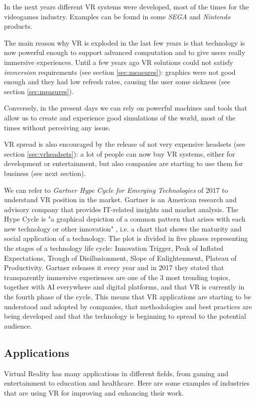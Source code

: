 \documentclass[binding=0.6cm,LaM]{sapthesis}
\begin{document}
In the next years different VR systems were developed, most of the times for the videogames industry. Examples can be found in some \textit{SEGA} and \textit{Nintendo} products. 

The main reason why VR is exploded in the last few years is that technology is now powerful enough to support advanced computation and to give users really immersive experiences. Until a few years ago VR solutions could not satisfy \textit{immersion} requirements (see section \ref{sec:measures}): graphics were not good enough and they had low refresh rates, causing the user some sickness (see section \ref{sec:measures}).

Conversely, in the present days we can rely on powerful machines and tools that allow us to create and experience good simulations of the world, most of the times without perceiving any issue.

VR spread is also encouraged by the release of not very expensive headsets (see section \ref{sec:vrheadsets}): a lot of people can now buy VR systems, either for development or entertainment, but also companies are starting to use them for business (see next section).

We can refer to \textit{Gartner Hype Cycle for Emerging Technologies} of 2017 \cite{hypecycle} to understand VR position in the market. Gartner is an American research and advisory company that provides IT-related insights and market analysis. The Hype Cycle is "a graphical depiction of a common pattern that arises with each new technology or other innovation" \cite{hypecycledef}, i.e. a chart that shows the maturity and social application of a technology. The plot is divided in five phases representing the stages of a technology life cycle: Innovation Trigger, Peak of Inflated Expectations, Trough of Disillusionment, Slope of Enlightenment, Plateau of Productivity. 
Gartner releases it every year and in 2017 they stated that transparently immersive experiences are one of the 3 most trending topics, together with AI everywhere and digital platforms, and that VR is currently in the fourth phase of the cycle. This means that VR applications are starting to be understood and adopted by companies, that methodologies and best practices are being developed and that the technology is beginning to spread to the potential audience.


\subsection{Applications}
Virtual Reality has many applications in different fields, from gaming and entertainment to education and healthcare. Here are some examples of industries that are using VR for improving and enhancing their work.
\end{document}
